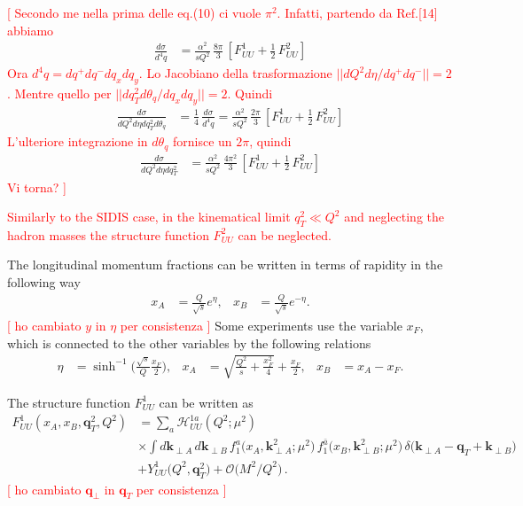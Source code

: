 \documentclass[aps,preprintnumbers,showpacs,nofootinbib,superscriptaddress,floatfix]{revtex4}
\newcommand{\T}{\perp}
\begin{document}
\textcolor{red}{[ Secondo me nella prima delle eq.(10) ci vuole $\pi^2$. Infatti, partendo da Ref.[14] abbiamo}
\begin{align}
\frac{d\sigma}{d^4q} &= \frac{\alpha^2}{s Q^2}\, \frac{8 \pi}{3} \, \left[ F_{UU}^1 + \frac{1}{2}\, F_{UU}^2 \right] 
\nonumber
\end{align}
\textcolor{red}{Ora $d^4 q = dq^+ dq^- dq_x dq_y$. Lo Jacobiano della trasformazione $|| dQ^2 d\eta / dq^+ dq^- || = 2$. Mentre quello per $||dq_T^2 d\theta_q / dq_x dq_y|| = 2$. Quindi }
\begin{align}
\frac{d\sigma}{dQ^2 d\eta dq_T^2 d\theta_q} &= \frac{1}{4} \, \frac{d\sigma}{d^4q} = \frac{\alpha^2}{s Q^2}\, \frac{2 \pi}{3} \, \left[ F_{UU}^1 + \frac{1}{2}\, F_{UU}^2 \right] 
\nonumber
\end{align}
\textcolor{red}{L'ulteriore integrazione in $d\theta_q$ fornisce un $2\pi$, quindi}
\begin{align}
\frac{d\sigma}{dQ^2 d\eta dq_T^2} &= \frac{\alpha^2}{s Q^2}\, \frac{4 \pi^2}{3} \, \left[ F_{UU}^1 + \frac{1}{2}\, F_{UU}^2 \right] 
\nonumber
\end{align}
\textcolor{red}{Vi torna? ]}

\textcolor{red}{Similarly to the SIDIS case, in the kinematical limit $q_T^2 \ll Q^2$ and neglecting the hadron masses the structure function $F_{UU}^2$ can be neglected.}

The longitudinal momentum fractions can be written in terms of
rapidity in the following way 
\begin{align}
x_A &= \frac{Q}{\sqrt{s}} e^{\eta},
&
x_B &= \frac{Q}{\sqrt{s}} e^{-\eta}.
\label{xab}
\end{align} 
\textcolor{red}{[ ho cambiato $y$ in $\eta$ per consistenza ]}
Some experiments use the variable $x_F$, which is connected to the other
variables  by the following relations
\begin{align}
\eta &= \sinh^{-1}\bigg(\frac{\sqrt{s}}{Q}\frac{x_F}{2}\bigg),
& 
x_{A} &= \sqrt{\frac{Q^2}{s} + \frac{x_F^2}{4}} + \frac{x_F}{2},
&
x_B &= x_A - x_F.  
\end{align} 

The structure function $F_{UU}^1$ can be written as
\begin{align}
\label{e:DYkT}
   F_{UU}^1(x_A,x_B, \bm{q}_{T}^2, Q^2) &= \sum_a \mathcal{H}_{UU}^{1 a}(Q^2;\mu^2) \\ 
      &\times \int d\bm{k}_{\T A}^{} \, d\bm{k}_{\T B}^{} 
\,  f_1^a\big(x_A,\bm{k}_{\T A}^2; \mu^2 \big) 
\, f_{1}^{\bar{a}}\big(x_B,\bm{k}_{\T B}^2; \mu^2 \big) \,
      \delta \big({\bm k}_{\T A} - {\bm q}_T + {\bm k}_{\T B}\big)
\nonumber\\&
\nonumber + Y_{UU}^1\big(Q^2, \bm{q}_T^2\big) + \mathcal{O}\big(M^2/Q^2\big) \, .
\end{align} 
\textcolor{red}{[ ho cambiato $\bm{q}_{\T}$ in $\bm{q}_T$ per consistenza ]}
\end{document}
